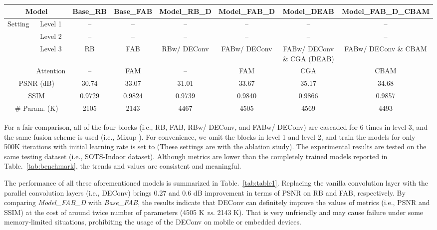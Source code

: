 \documentclass[lettersize,journal]{IEEEtran}
\begin{document}
\begin{table*}[h]
	\footnotesize
	\centering
	\caption{Ablation study of DEConv and CGA. All the experiments are conducted on SOTS-Indoor \cite{li2018TIP} dataset.}
	\label{tab:table1}
	\begin{tabular}{c|c|cccccc}
		\toprule
		\multicolumn{2}{c|}{Model}         & Base\_RB     & Base\_FAB     & Model\_RB\_D & Model\_FAB\_D & Model\_DEAB & Model\_FAB\_D\_CBAM  \\
		\midrule \midrule
		\multirow{4}{*}{Setting} & Level 1 & --    & --    & -- & -- & --&-- \\
		& Level 2 & --  & --  & -- &-- &-- &--\\
		& Level 3 & RB & FAB & RB{\tiny w/ DEConv} & FAB{\tiny w/ DEConv} & FAB{\tiny w/ DEConv \& CGA} (DEAB) & FAB{\tiny w/ DEConv \& CBAM} \\ 
		&Attention & -- & FAM & -- & FAM  & CGA & CBAM \cite{woo2018ECCV} \\ 
		\midrule \midrule
		\multicolumn{2}{c|}{PSNR (dB)}     & 30.74      &  33.07     & 31.01   &  33.67  & 35.17 & 34.68 \\
		\multicolumn{2}{c|}{SSIM}          & 0.9729      &  0.9824     & 0.9739  &  0.9840  & 0.9866 & 0.9857\\
		\multicolumn{2}{c|}{\# Param. (K)}  & 2105      & 2143    & 4467   & 4505    & 4569& 4493 \\ 
		\bottomrule
	\end{tabular}
\end{table*}

For a fair comparison, all of the four blocks (i.e., RB, FAB, RB{\tiny w/ DEConv}, and FAB{\tiny w/ DEConv}) are cascaded for 6 times in level 3, and the same fusion scheme is used (i.e., Mixup \cite{qin2020AAAI}).
For convenience, we omit the blocks in level 1 and level 2, and train the models for only 500K iterations with initial learning rate is set to  (These settings are with the ablation study).
The experimental results are tested on the same testing dataset (i.e., SOTS-Indoor \cite{li2018TIP} dataset).
Although metrics are lower than the completely trained models reported in Table.~\ref{tab:benchmark}, the trends and values are consistent and meaningful.

The performance of all these aforementioned models is summarized in Table.~\ref{tab:table1}.
Replacing the vanilla convolution layer with the parallel convolution layers (i.e., DEConv) brings 0.27 and 0.6 dB improvement in terms of PSNR on RB and FAB, respectively.
By comparing \textit{Model\_FAB\_D} with \textit{Base\_FAB}, the results indicate that DEConv can definitely improve the values of metrics (i.e., PSNR and SSIM) at the cost of around twice number of parameters (4505 K \emph{vs.} 2143 K).
That is very unfriendly and may cause failure under some memory-limited situations, prohibiting the usage of the DEConv on mobile or embedded devices.
\end{document}
